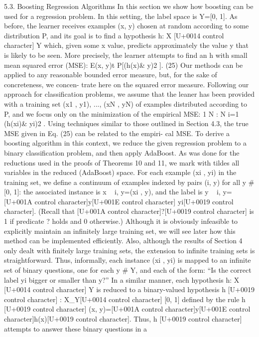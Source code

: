 \documentclass[10pt]{article}
\begin{document}
\begin{ReviewVerbatim}
5.3. Boosting Regression Algorithms
In this section we show how boosting can be used for a
regression problem. In this setting, the label space is
Y=[0, 1]. As before, the learner receives examples (x, y)
chosen at random according to some distribution P, and its
goal is to find a hypothesis h: X [U+0014 control character] Y which, given some x
value, predicts approximately the value y that is likely to be
seen. More precisely, the learner attempts to find an h with
small mean squared error (MSE):
E(x, y)t P[(h(x)& y)2
]. (25)
Our methods can be applied to any reasonable bounded
error measure, but, for the sake of concreteness, we concen-
trate here on the squared error measure.
Following our approach for classification problems, we
assume that the leaner has been provided with a training set
(x1 , y1), ..., (xN , yN) of examples distributed according to
P, and we focus only on the minimization of the empirical
MSE:
1
N
:
N
i=1
(h(xi)& yi)2
.
Using techniques similar to those outlined in Section 4.3,
the true MSE given in Eq. (25) can be related to the empiri-
cal MSE.
To derive a boosting algorithm in this context, we reduce
the given regression problem to a binary classification
problem, and then apply AdaBoost. As was done for the
reductions used in the proofs of Theorems 10 and 11, we
mark with tildes all variables in the reduced (AdaBoost)
space. For each example (xi , yi) in the training set, we
define a continuum of examples indexed by pairs (i, y) for
all y # [0, 1]: the associated instance is x
~ i, y=(xi , y), and
the label is y
~ i, y=[U+001A control character]y[U+001E control character] yi[U+0019 control character]. (Recall that [U+001A control character]?[U+0019 control character] is 1 if predicate
? holds and 0 otherwise.) Although it is obviously infeasible
to explicitly maintain an infinitely large training set, we will
see later how this method can be implemented efficiently.
Also, although the results of Section 4 only dealt with
finitely large training sets, the extension to infinite training
sets is straightforward.
Thus, informally, each instance (xi , yi) is mapped to an
infinite set of binary questions, one for each y # Y, and each
of the form: ``Is the correct label yi bigger or smaller than y?''
In a similar manner, each hypothesis h: X [U+0014 control character] Y is reduced
to a binary-valued hypothesis h
[U+0019 control character] : X_Y[U+0014 control character] [0, 1] defined by
the rule
h
[U+0019 control character] (x, y)=[U+001A control character]y[U+001E control character]h(x)[U+0019 control character].
Thus, h
[U+0019 control character] attempts to answer these binary questions in a

\end{ReviewVerbatim}
\end{document}
